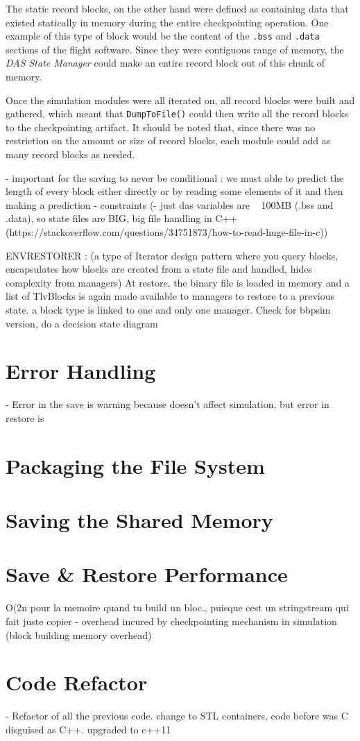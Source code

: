 {The static record blocks, on the other hand were defined as containing data that existed statically in memory during the entire checkpointing operation. One example of this type of block would be the content of the \texttt{.bss} and \texttt{.data} sections of the flight software. Since they were contiguous range of memory, the \textit{DAS State Manager} could make an entire record block out of this chunk of memory. 

Once the simulation modules were all iterated on, all record blocks were built and gathered, which meant that \texttt{DumpToFile()} could then write all the record blocks to the checkpointing artifact. It should be noted that, since there was no restriction on the amount or size of record blocks, each module could add as many record blocks as needed. 

- important for the saving to never be conditional : we must able to predict the length of every block either directly or by reading some elements of it and then making a prediction
- constraints (- just das variables are ~ 100MB (.bss and .data), so state files are BIG, big file handling in C++  (https://stackoverflow.com/questions/34751873/how-to-read-huge-file-in-c))

ENVRESTORER : (a type of Iterator design pattern where you query blocks, encapsulates how blocks are created from a state file and handled, hides complexity from managers) At restore, the binary file is loaded in memory and a list of TlvBlocks is again made available to managers to restore to a previous state. a block type is linked to one and only one manager. Check for bbpsim version, do a decision state diagram

\section{Error Handling}
- Error in the save is warning because doesn't affect simulation, but error in restore is 

\section{Packaging the File System}

\section{Saving the Shared Memory}

\section{Save \& Restore Performance}
O(2n pour la memoire quand tu build un bloc., puisque cest un stringstream qui fait juste copier
- overhead incured by checkpointing mechanism in simulation (block building memory overhead)

\section{Code Refactor}
- Refactor of all the previous code. change to STL containers, code before was C disguised as C++. upgraded to c++11
}